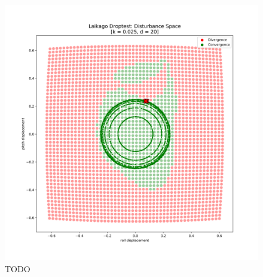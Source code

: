     \begin{figure}[ht]
    \centering
    \includegraphics[width=.7\linewidth]{figures/droptest_ds_overay_v10000.png}
    \caption{TODO}
    \label{fig:dropoverlay}
    \end{figure}
